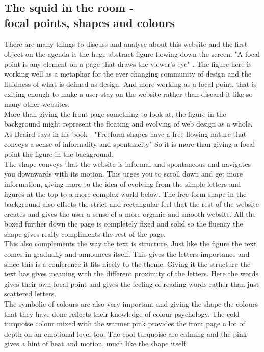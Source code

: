 \documentclass{article}
\begin{document}
	    \subsection{The squid in the room - \\focal points, shapes and colours}
		    There are many things to discuss and analyse about this website and the first object on the agenda is the huge abstract figure flowing down the screen. "A focal point is any element on a page that draws the viewer’s eye" \citep[Page. 22]{PWebDesign}. The figure here is working well as a metaphor for the ever changing community of design and the fluidness of what is defined as design. And more working as a focal point, that is exiting enough to make a user stay on the website rather than discard it like so many other websites. \\More than giving the front page something to look at, the figure in the background might represent the floating and evolving of web design as a whole. As Beaird says in his book - "Freeform shapes have a free-flowing nature that conveys a sense of informality and spontaneity"\citep[Page. 86]{PWebDesign} So it is more than giving a focal point the figure in the background.\\ The shape conveys that the website is informal and spontaneous and navigates you downwards with its motion. This urges you to scroll down and get more information, giving more to the idea of evolving from the simple letters and figures at the top to a more complex world below. The free-form shape in the background also offsets the strict and rectangular feel that the rest of the website creates and gives the user a sense of a more organic and smooth website. All the boxed further down the page is completely fixed and solid so the fluency the shape gives really compliments the rest of the page. \\This also complements the way the text is structure. Just like the figure the text comes in gradually and announces itself. This gives the letters importance and since this is a conference it fits nicely to the theme. Giving it the structure the text has gives meaning with the different proximity of the letters. Here the words gives their own focal point and gives the feeling of reading words rather than just scattered letters.\\
            The symbolic of colours are also very important and giving the shape the colours that they have done reflects their knowledge of colour psychology. The cold turquoise colour mixed with the warmer pink provides the front page a lot of depth on an emotional level too. The cool turquoise are calming and the pink gives a hint of heat and motion, much like the shape itself. \citep[Page. 50]{PWebDesign} 
\end{document}
